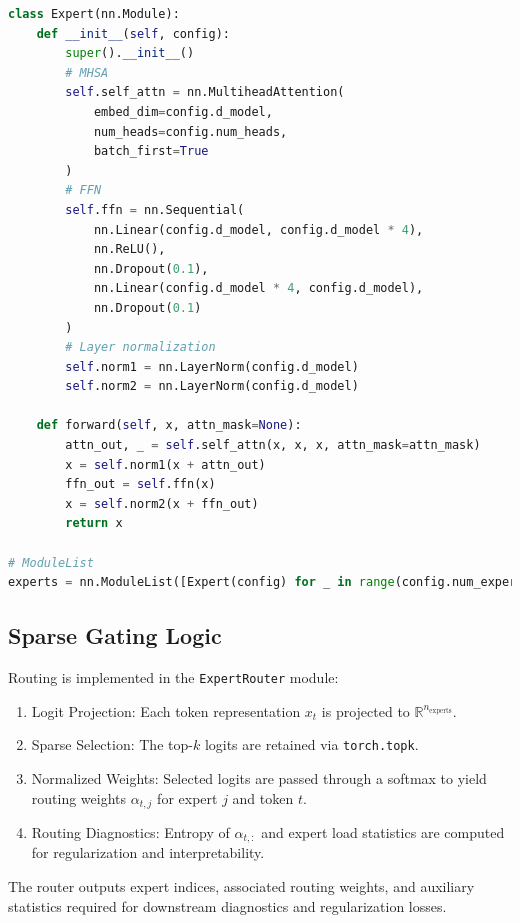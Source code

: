 \documentclass{article}
\begin{document}
\begin{lstlisting}[language=Python, caption={\texttt{Expert} module \& container}, label={lst:expert}]
class Expert(nn.Module):
    def __init__(self, config):
        super().__init__()
        # MHSA
        self.self_attn = nn.MultiheadAttention(
            embed_dim=config.d_model,
            num_heads=config.num_heads,
            batch_first=True
        )
        # FFN
        self.ffn = nn.Sequential(
            nn.Linear(config.d_model, config.d_model * 4),
            nn.ReLU(),
            nn.Dropout(0.1),
            nn.Linear(config.d_model * 4, config.d_model),
            nn.Dropout(0.1)
        )
        # Layer normalization 
        self.norm1 = nn.LayerNorm(config.d_model)
        self.norm2 = nn.LayerNorm(config.d_model)

    def forward(self, x, attn_mask=None):
        attn_out, _ = self.self_attn(x, x, x, attn_mask=attn_mask)
        x = self.norm1(x + attn_out)
        ffn_out = self.ffn(x)
        x = self.norm2(x + ffn_out)
        return x

# ModuleList
experts = nn.ModuleList([Expert(config) for _ in range(config.num_experts)])

\end{lstlisting}



\subsection{Sparse Gating Logic}
Routing is implemented in the \texttt{ExpertRouter} module:
\begin{enumerate}
    \item {Logit Projection:} Each token representation $x_t$ is projected to $\mathbb{R}^{n_{\mathrm{experts}}}$.
    \item {Sparse Selection:} The top-$k$ logits are retained via \texttt{torch.topk}.
    \item {Normalized Weights:} Selected logits are passed through a softmax to yield routing weights $\alpha_{t,j}$ for expert $j$ and token $t$.
    \item {Routing Diagnostics:} Entropy of $\alpha_{t,:}$ and expert load statistics are computed for regularization and interpretability.
\end{enumerate}
The router outputs expert indices, associated routing weights, and auxiliary statistics required for downstream diagnostics and regularization losses.
\end{document}
